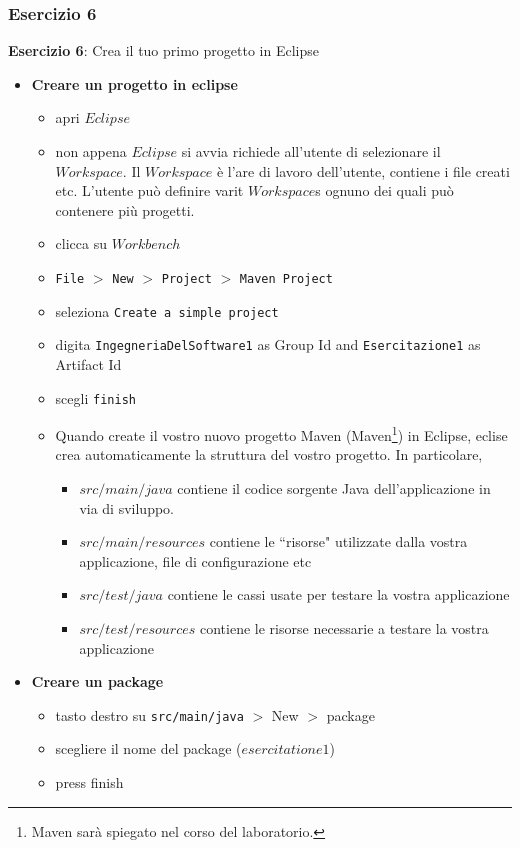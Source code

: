\documentclass{article}
\theoremstyle{definition}
\begin{document}
\subsubsection{Esercizio 6}
\begin{framed}
\textbf{Esercizio 6}: Crea il tuo primo progetto in Eclipse
\end{framed}

\begin{itemize}
\item \textbf{Creare un progetto in eclipse}
\begin{itemize}
\item apri $Eclipse$
\item non appena $Eclipse$ si avvia richiede all'utente di selezionare il $Workspace$. Il $Workspace$ \`e l'are di lavoro dell'utente, contiene i file creati etc. L'utente pu\`o definire varit $Workspace$s ognuno dei quali pu\`o contenere pi\`u progetti.
\item clicca su $Workbench$ 
\item \texttt{File} $>$ \texttt{New} $>$ \texttt{Project} $>$ \texttt{Maven Project}
\item seleziona \texttt{Create a simple project}
\item digita \texttt{IngegneriaDelSoftware1} as Group Id and \texttt{Esercitazione1} as Artifact Id
\item scegli \texttt{finish}
\item Quando create il vostro nuovo progetto Maven (Maven\footnote{Maven sar\`a spiegato nel corso del laboratorio.}) in Eclipse, eclise crea automaticamente la struttura del vostro progetto. In particolare, 
\begin{itemize}
\item $src/main/java$ contiene il codice sorgente Java dell'applicazione in via di sviluppo.
\item $src/main/resources$ contiene le ``risorse" utilizzate dalla vostra applicazione, file di configurazione etc
\item $src/test/java$ contiene le cassi usate per testare la vostra applicazione
\item $src/test/resources$ contiene le risorse necessarie a testare la vostra applicazione
\end{itemize}
\end{itemize}
\end{itemize}



\begin{itemize}
\item \textbf{Creare un package}
\begin{itemize}
\item tasto destro su \texttt{src/main/java} $>$ New $>$ package 
\item scegliere il nome del package ($esercitatione1$)
\item press finish
\end{itemize}
\end{itemize}
\end{document}
